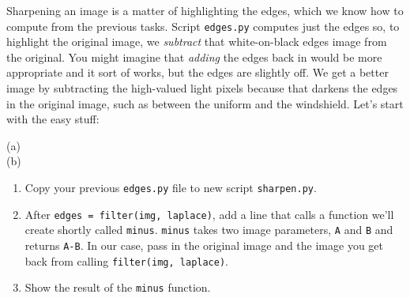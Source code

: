 \documentclass[titlepage]{tufte-book}
\begin{document}
Sharpening an image is a matter of highlighting the edges, which we know how to compute from the previous tasks. Script {\tt edges.py} computes just the edges so, to highlight the original image, we {\em subtract} that white-on-black edges image from the original.  You might imagine that {\em adding} the edges back in would be more appropriate and it sort of works, but the edges are slightly off. We get a better image by subtracting the high-valued light pixels because that darkens the edges in the original image, such as between the uniform and the windshield. Let's start with the easy stuff:

\begin{marginfigure}
\begin{center}
(a) \\
(b) 
\end{center}
\caption{Bonkers the cat portrait. (a) original and (b) sharpened as computed by {\tt sharpen.py}.}
\label{jeepedges}
\end{marginfigure}

\begin{enumerate}
\item Copy your previous {\tt edges.py} file to new script {\tt sharpen.py}.
\item After {\tt edges = filter(img, laplace)}, add a line that calls a function we'll create shortly called {\tt minus}. {\tt minus} takes two image parameters, {\tt A} and {\tt B} and returns {\tt A-B}.  In our case, pass in the original image and the image you get back from calling {\tt filter(img, laplace)}.
\item Show the result of the {\tt minus} function.
\end{enumerate}
\end{document}
